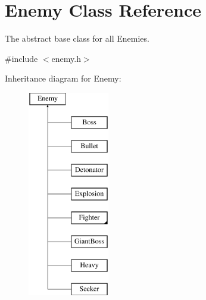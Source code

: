 \hypertarget{classEnemy}{
\section{Enemy Class Reference}
\label{classEnemy}
}


The abstract base class for all Enemies.  




{\ttfamily \#include $<$enemy.h$>$}

Inheritance diagram for Enemy:\begin{figure}[H]
\begin{center}
\leavevmode
\includegraphics[height=9.000000cm]{classEnemy}
\end{center}
\end{figure}
